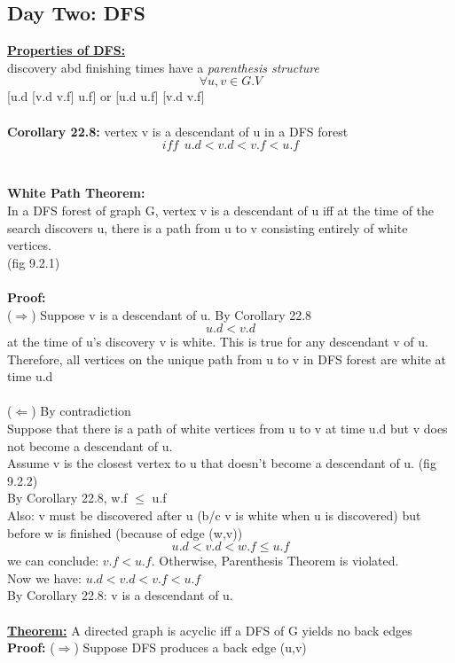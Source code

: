 \documentclass{article}
\begin{document}
	 \subsection{Day Two: DFS\\}
	 \textbf{\underline{Properties of DFS:\\}}
	 discovery abd finishing times have a \emph{parenthesis structure}
	 $$\forall u,v \in G.V$$
	 [u.d [v.d v.f] u.f] or [u.d u.f] [v.d v.f]\\\\
	 \textbf{Corollary 22.8: }vertex v is a descendant of u in a DFS forest 
	 $$iff~~u.d < v.d < v.f < u.f$$\\\\
	 \textbf{White Path Theorem:\\}
	 In a DFS forest of graph G, vertex v is a descendant of u iff at the time of the search discovers u, there is a path from u to v consisting entirely of white vertices.\\
	 (fig 9.2.1)\\\\
	\textbf{Proof:}\\
	 ($\Rightarrow$) Suppose v is a descendant of u. By Corollary 22.8 $$u.d < v.d$$ at the time of u's discovery v is white. This is true for any descendant v of u. Therefore, all vertices on the unique path from u to v in DFS forest are white at time u.d\\\\
	 ($\Leftarrow$) By contradiction\\
	 Suppose that there is a path of white vertices from u to v at time u.d but v does not become a descendant of u.\\
	 Assume v is the closest vertex to u that doesn't become a descendant of u. (fig 9.2.2)\\
	 By Corollary 22.8, w.f $\le$ u.f\\
	 Also: v must be discovered after u (b/c v is white when u is discovered) but before w is finished (because of edge (w,v))\\
	 $$u.d<v.d<w.f\le u.f$$
	 we can conclude: $v.f<u.f$. Otherwise, Parenthesis Theorem is violated.\\
	 Now we have: $u.d<v.d<v.f<u.f$\\
	 By Corollary 22.8: v is a descendant of u.\\\\
	 \textbf{\underline{Theorem:}} A directed graph is acyclic iff a DFS of G yields no back edges\\
	 \textbf{Proof:} ($\Rightarrow$) Suppose DFS produces a back edge (u,v)\\
\end{document}
